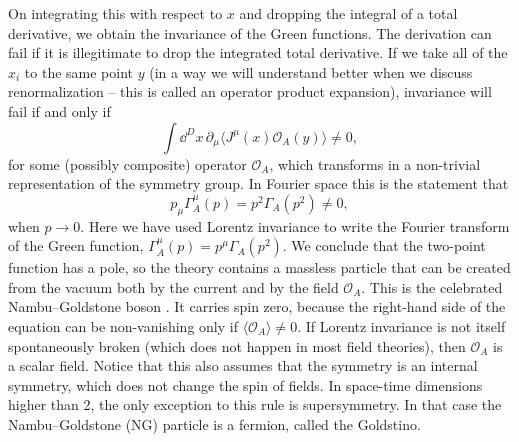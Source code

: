 On integrating this with respect to $x$ and dropping the integral of a total
derivative, we obtain the invariance of the Green functions. The derivation can
fail if it is illegitimate to drop the integrated total derivative. If we take
all of the $x_i$ to the same point $y$ (in a way we will understand better when
we discuss renormalization -- this is called an operator product expansion),
invariance will fail if and only if
\begin{equation*}
  \int\dd^D x\,\partial_\mu\langle J^\mu(x)\mathcal O_A(y)\rangle\ne0,
\end{equation*}
for some (possibly composite) operator $\mathcal O_A$, which transforms in a
non-trivial representation of the symmetry group. In Fourier space this is the
statement that
\begin{equation*}
  p_\mu\Gamma_A^\mu(p)=p^2\Gamma_A(p^2)\ne0,
\end{equation*}
when $p\to0$. Here we have used Lorentz invariance to write the Fourier
transform of the Green function, $\Gamma_A^\mu(p)=p^\mu\Gamma_A(p^2)$. We
conclude that the two-point function has a pole, so the theory contains a
massless particle that can be created from the vacuum both by the current and by
the field $\mathcal O_A$. This is the celebrated Nambu--Goldstone boson
\cite{banks-ref-36,banks-ref-37,banks-ref-38,banks-ref-39,banks-ref-40}. It carries spin zero, because the right-hand side of the equation can
be non-vanishing only if $\langle\mathcal O_A\rangle\ne0$. If Lorentz
invariance is not itself spontaneously broken (which does not happen in most
field theories), then $\mathcal O_A$ is a scalar field. Notice that this also
assumes that the symmetry is an internal symmetry, which does not change the spin
of fields. In space-time dimensions higher than 2, the only exception to this
rule is supersymmetry. In that case the Nambu--Goldstone (NG) particle is a
fermion, called the Goldstino.

